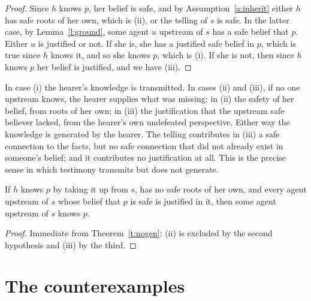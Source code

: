 \documentclass{situationist-preprint}
\begin{document}
\begin{proof}
Since $h$ knows $p$, her belief is safe, and by Assumption~\ref{a:inherit} either $h$ has safe roots of her own, which is (ii), or the telling of $s$ is safe. In the latter case, by Lemma~\ref{l:ground}, some agent $u$ upstream of $s$ has a safe belief that $p$. Either $u$ is justified or not. If she is, she has a justified safe belief in $p$, which is true since $h$ knows it, and so she knows $p$, which is (i). If she is not, then since $h$ knows $p$ her belief is justified, and we have (iii).
\end{proof}

In case (i) the hearer's knowledge is transmitted. In cases (ii) and (iii), if no one upstream knows, the hearer supplies what was missing: in (ii) the safety of her belief, from roots of her own; in (iii) the justification that the upstream safe believer lacked, from the hearer's own undefeated perspective. Either way the knowledge is generated by the hearer. The telling contributes in (iii) a safe connection to the facts, but no safe connection that did not already exist in someone's belief; and it contributes no justification at all. This is the precise sense in which testimony transmits but does not generate.

\begin{corollary}\label{c:pure}
If $h$ knows $p$ by taking it up from $s$, has no safe roots of her own, and every agent upstream of $s$ whose belief that $p$ is safe is justified in it, then some agent upstream of $s$ knows $p$.
\end{corollary}

\begin{proof}
Immediate from Theorem~\ref{t:nogen}: (ii) is excluded by the second hypothesis and (iii) by the third.
\end{proof}

\section{The counterexamples}
\end{document}

